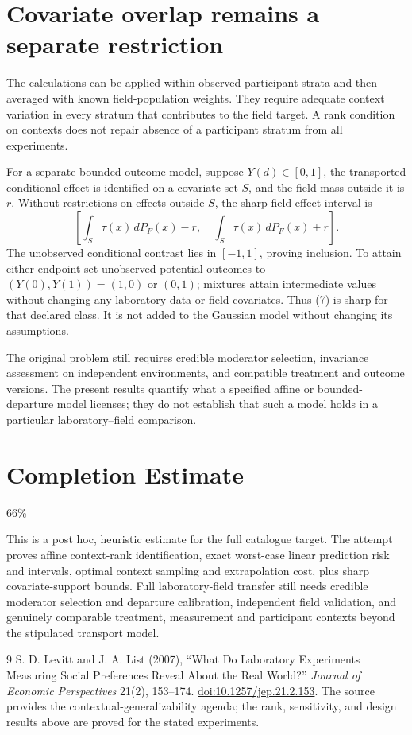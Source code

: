 \documentclass[11pt,a4paper]{article}
\theoremstyle{remark}
\begin{document}
\section{Covariate overlap remains a separate restriction}
The calculations can be applied within observed participant strata and then averaged with known field-population weights. They require adequate context variation in every stratum that contributes to the field target. A rank condition on contexts does not repair absence of a participant stratum from all experiments.

For a separate bounded-outcome model, suppose $Y(d)\in[0,1]$, the transported conditional effect is identified on a covariate set $S$, and the field mass outside it is $r$. Without restrictions on effects outside $S$, the sharp field-effect interval is
\[
 \left[\int_S\tau(x)\,dP_F(x)-r,\quad
       \int_S\tau(x)\,dP_F(x)+r\right]. \tag{7}
\]
The unobserved conditional contrast lies in $[-1,1]$, proving inclusion. To attain either endpoint set unobserved potential outcomes to $(Y(0),Y(1))=(1,0)$ or $(0,1)$; mixtures attain intermediate values without changing any laboratory data or field covariates. Thus (7) is sharp for that declared class. It is not added to the Gaussian model without changing its assumptions.

The original problem still requires credible moderator selection, invariance assessment on independent environments, and compatible treatment and outcome versions. The present results quantify what a specified affine or bounded-departure model licenses; they do not establish that such a model holds in a particular laboratory--field comparison.

\section{Completion Estimate}
66\%

This is a post hoc, heuristic estimate for the full catalogue target.
The attempt proves affine context-rank identification, exact worst-case linear prediction risk and intervals, optimal context sampling and extrapolation cost, plus sharp covariate-support bounds. Full laboratory-field transfer still needs credible moderator selection and departure calibration, independent field validation, and genuinely comparable treatment, measurement and participant contexts beyond the stipulated transport model.

\begin{thebibliography}{9}
 S. D. Levitt and J. A. List (2007), ``What Do Laboratory Experiments Measuring Social Preferences Reveal About the Real World?'' \emph{Journal of Economic Perspectives} 21(2), 153--174. \href{https://doi.org/10.1257/jep.21.2.153}{doi:10.1257/jep.21.2.153}. The source provides the contextual-generalizability agenda; the rank, sensitivity, and design results above are proved for the stated experiments.
\end{thebibliography}
\end{document}
